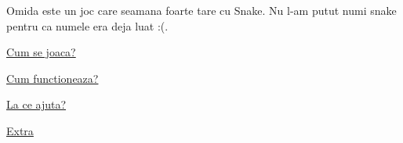 Omida este un joc care seamana foarte tare cu Snake. Nu l-\/am putut numi snake pentru ca numele era deja luat \+:(.


\begin{DoxyItemize}
\item \hyperlink{cum_se_joaca}{Cum se joaca?}
\item \hyperlink{cum_functioneaza}{Cum functioneaza?}
\item \hyperlink{la_ce_ajuta}{La ce ajuta?}
\item \hyperlink{extra}{Extra} 
\end{DoxyItemize}